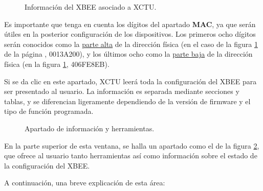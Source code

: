 \begin{figure}[H] %
\caption{Información del XBEE asociado a XCTU.}
\label{fig:RtrInf}
\end{figure}

Es importante que tenga en cuenta los dígitos del apartado \textbf{MAC}, ya que serán útiles en la posterior configuración de los dispositivos. Los primeros ocho dígitos serán conocidos como la \underline{parte alta} de la dirección física (en el caso de la figura \ref{fig:RtrInf} de la página \pageref{fig:RtrInf}, 0013A200), y los últimos ocho como la \underline{parte baja} de la dirección física (en la figura \ref{fig:RtrInf}, 406FE8EB).

Si se da clic en este apartado, XCTU leerá toda la configuración del XBEE para ser presentado al usuario. La información es separada mediante secciones y tablas, y se diferencian ligeramente dependiendo de la versión de firmware y el tipo de función programada. 

\begin{figure}[H] %
\caption{Apartado de información y herramientas.}
\label{fig:TMain}
\end{figure}

En la parte superior de esta ventana, se halla un apartado como el de la figura \ref{fig:TMain}, que ofrece al usuario tanto herramientas así como información sobre el estado de la configuración del XBEE.

A continuación, una breve explicación de esta área:

